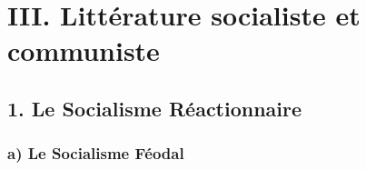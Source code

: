 \documentclass[french,twoside]{book} %
\newcommand\chapteropen{} %
\newcommand\chaptercont{} %
\begin{document}
\chapteropen

\chapter[{III. Littérature socialiste et communiste}]{III. Littérature socialiste et communiste}
\renewcommand{\leftmark}{III. Littérature socialiste et communiste}
\label{III}


\chaptercont

\section[{1. Le Socialisme Réactionnaire}]{1. Le Socialisme Réactionnaire}
\label{III1}


\subsection[{a) Le Socialisme Féodal}]{a) Le Socialisme Féodal}
\label{III1a}
\end{document}
